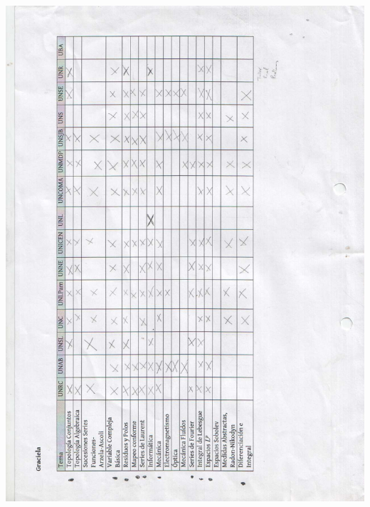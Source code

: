 \documentclass[a4paper,10pt,BCOR10mm,oneside,headsepline]{scrbook}
\begin{document}
\begin{subappendices}
\includegraphics[scale=.3]{01-3.jpg}
\newpage

\end{subappendices}
\end{document}
